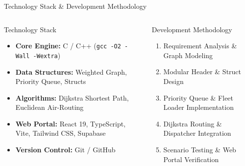 \documentclass[aspectratio=169,11pt]{beamer}
\begin{document}
\begin{frame}{Technology Stack \& Development Methodology}
\footnotesize
\begin{columns}[T,totalwidth=\textwidth]
\begin{block}{Technology Stack}
\begin{itemize}\itemsep2pt
\item \textbf{Core Engine:} C / C++ (\texttt{gcc -O2 -Wall -Wextra})
\item \textbf{Data Structures:} Weighted Graph, Priority Queue, Structs
\item \textbf{Algorithms:} Dijkstra Shortest Path, Euclidean Air-Routing
\item \textbf{Web Portal:} React 19, TypeScript, Vite, Tailwind CSS, Supabase
\item \textbf{Version Control:} Git / GitHub
\end{itemize}
\end{block}
\begin{block}{Development Methodology}
\begin{enumerate}\itemsep2pt
\item Requirement Analysis \& Graph Modeling
\item Modular Header \& Struct Design
\item Priority Queue \& Fleet Loader Implementation
\item Dijkstra Routing \& Dispatcher Integration
\item Scenario Testing \& Web Portal Verification
\end{enumerate}
\end{block}
\end{columns}
\end{frame}
\end{document}
